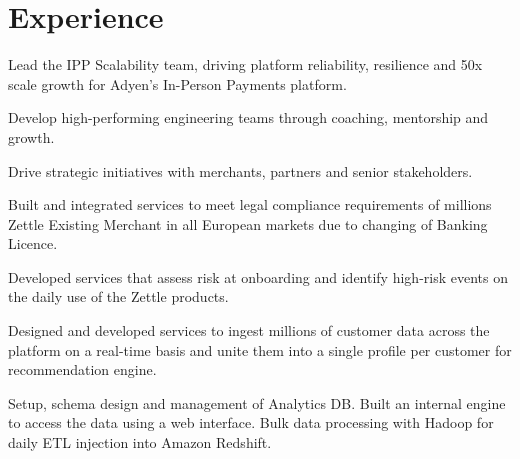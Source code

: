 \documentclass[]{rajnikant-resume-openfont}
\begin{document}
\hfill
\begin{minipage}[t]{0.66\textwidth} 


\section{Experience}

\begin{tightemize}

\item Lead the IPP Scalability team, driving platform reliability, resilience and 50x scale growth for Adyen’s In-Person Payments platform.
\item Develop high-performing engineering teams through coaching, mentorship and growth.
\item Drive strategic initiatives with merchants, partners and senior stakeholders.
\end{tightemize}
\sectionsep

\begin{tightemize}

\item  {} Built and integrated services to meet legal compliance requirements of ​millions ​Zettle​ ​Existing Merchant in all European markets due to changing of Banking Licence.  
\item  {} Developed services that assess risk at onboarding and identify high-risk events on the daily use of the Zettle products.
\end{tightemize}
\sectionsep

\begin{tightemize}
\item {}  Designed and developed services to ingest millions of customer data across the platform on a
real-time basis and unite them into a single profile per customer for recommendation engine.
\item {} Setup, schema design and management of Analytics DB. Built an internal engine to
access the data using a web interface. Bulk data processing with Hadoop for daily ETL injection into Amazon Redshift.


\end{tightemize}
\end{minipage}
\end{document}
